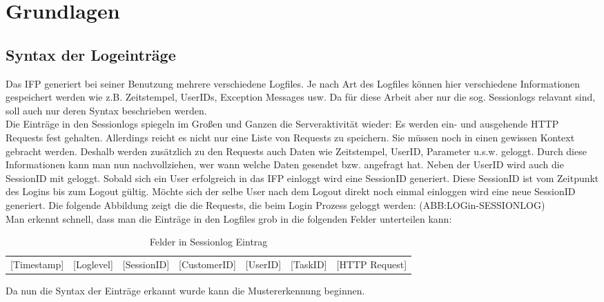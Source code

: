 \section{Grundlagen}\raggedbottom

\subsection{Syntax der Logeinträge}
\label{sub:Aufbau der Logeinträge}
Das IFP generiert bei seiner Benutzung mehrere verschiedene Logfiles. Je nach Art des Logfiles können hier verschiedene Informationen gespeichert werden wie z.B. Zeitstempel, UserIDs, Exception Messages usw. Da für diese Arbeit aber nur die sog. \glqq Sessionlogs\grqq{} relavant sind, soll auch nur deren Syntax beschrieben werden.\\
Die Einträge in den Sessionlogs spiegeln im Großen und Ganzen die Serveraktivität wieder: Es werden ein- und ausgehende HTTP Requests fest gehalten. Allerdings reicht es nicht nur eine Liste von Requests zu speichern. Sie müssen noch in einen gewissen Kontext gebracht werden. Deshalb werden zusätzlich zu den Requests auch Daten wie Zeitstempel, UserID, Parameter u.s.w. geloggt. Durch diese Informationen kann man nun nachvollziehen, wer wann welche Daten gesendet bzw. angefragt hat. Neben der UserID wird auch die SessionID mit geloggt. Sobald sich ein User erfolgreich in das IFP einloggt wird eine SessionID generiert. Diese SessionID ist vom Zeitpunkt des Logins bis zum Logout gültig. Möchte sich der selbe User nach dem Logout direkt noch einmal einloggen wird eine neue SessionID generiert. Die folgende Abbildung zeigt die die Requests, die beim Login Prozess geloggt werden: (ABB:LOGin-SESSIONLOG)
\\
Man erkennt schnell, dass man die Einträge in den Logfiles grob in die folgenden Felder unterteilen kann:\\
\begin{table}[htb]
	\begin{center}
		\begin{tabular}{lllllll}
			[Timestamp]&[Loglevel]&[SessionID]&[CustomerID]&[UserID]&[TaskID]&[HTTP Request]
		\end{tabular}
		\caption{Felder in Sessionlog Eintrag}
		\label{tab_session_fields}
	\end{center}
\end{table}

Da nun die Syntax der Einträge erkannt wurde kann die Mustererkennung beginnen.


